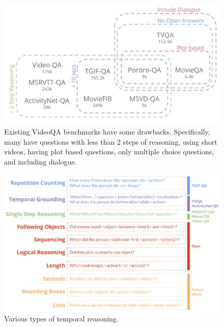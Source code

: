\begin{figure}[t]
\begin{center}
\includegraphics[width=0.8\linewidth]{Figures/figure_videoQA.png}
\end{center}
   \caption{Existing VideoQA benchmarks have some drawbacks. Specifically, many have questions with less than 2 steps of reasoning, using short videos, having plot based questions, only multiple choice questions, and including dialogue.}
\label{existing_benchmarks}
\end{figure}


\begin{figure}[t]
\begin{center}
\includegraphics[width=0.8\linewidth]{Figures/figure_temporalTypes.png}
\end{center}
   \caption{Various types of temporal reasoning.}
\label{temporal_types}
\end{figure}


